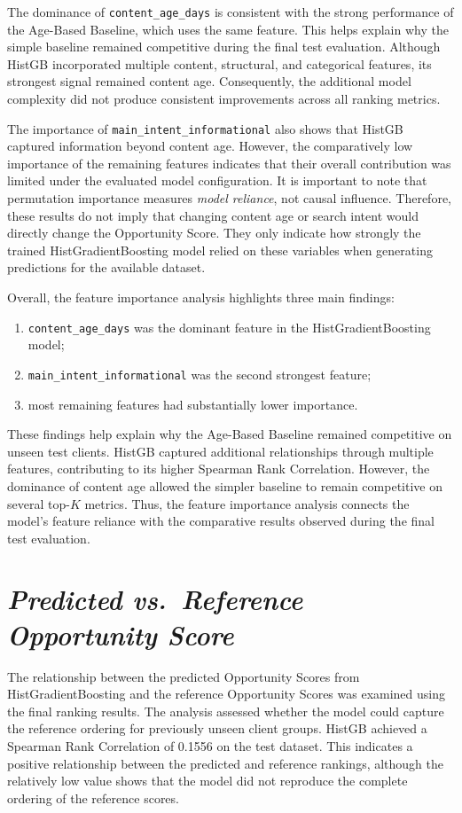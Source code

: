 \documentclass[12pt,a4paper]{report}
\begin{document}
The dominance of \texttt{content\_age\_days} is consistent with the strong performance of the Age-Based Baseline, which uses the same feature. This helps explain why the simple baseline remained competitive during the final test evaluation. Although HistGB incorporated multiple content, structural, and categorical features, its strongest signal remained content age. Consequently, the additional model complexity did not produce consistent improvements across all ranking metrics.

The importance of \texttt{main\_intent\_informational} also shows that HistGB captured information beyond content age. However, the comparatively low importance of the remaining features indicates that their overall contribution was limited under the evaluated model configuration. It is important to note that permutation importance measures \textit{model reliance}, not causal influence. Therefore, these results do not imply that changing content age or search intent would directly change the Opportunity Score. They only indicate how strongly the trained HistGradientBoosting model relied on these variables when generating predictions for the available dataset.

Overall, the feature importance analysis highlights three main findings:

\begin{enumerate}
    \item \texttt{content\_age\_days} was the dominant feature in the HistGradientBoosting model;

    \item \texttt{main\_intent\_informational} was the second strongest feature;

    \item most remaining features had substantially lower importance.
\end{enumerate}

These findings help explain why the Age-Based Baseline remained competitive on unseen test clients. HistGB captured additional relationships through multiple features, contributing to its higher Spearman Rank Correlation. However, the dominance of content age allowed the simpler baseline to remain competitive on several top-$K$ metrics. Thus, the feature importance analysis connects the model's feature reliance with the comparative results observed during the final test evaluation.

\section{\textit{Predicted vs.\ Reference Opportunity Score}}
The relationship between the predicted Opportunity Scores from HistGradientBoosting and the reference Opportunity Scores was examined using the final ranking results. The analysis assessed whether the model could capture the reference ordering for previously unseen client groups. HistGB achieved a Spearman Rank Correlation of 0.1556 on the test dataset. This indicates a positive relationship between the predicted and reference rankings, although the relatively low value shows that the model did not reproduce the complete ordering of the reference scores.
\end{document}
